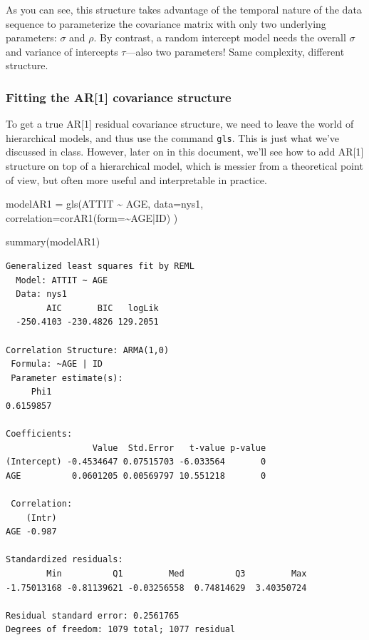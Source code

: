 \documentclass[
  letterpaper,
  DIV=11,
  numbers=noendperiod]{scrreprt}
\newenvironment{Shaded}{\begin{snugshade}}{\end{snugshade}}
\newcommand{\AttributeTok}[1]{\textcolor[rgb]{0.49,0.56,0.16}{#1}}
\newcommand{\FunctionTok}[1]{\textcolor[rgb]{0.02,0.16,0.49}{#1}}
\newcommand{\NormalTok}[1]{\textcolor[rgb]{0.00,0.44,0.13}{#1}}
\newcommand{\OtherTok}[1]{\textcolor[rgb]{0.00,0.44,0.13}{#1}}
\newcommand{\SpecialCharTok}[1]{\textcolor[rgb]{0.25,0.44,0.63}{#1}}
\begin{document}
As you can see, this structure takes advantage of the temporal nature of
the data sequence to parameterize the covariance matrix with only two
underlying parameters: \(\sigma\) and \(\rho\). By contrast, a random
intercept model needs the overall \(\sigma\) and variance of intercepts
\(\tau\)---also two parameters! Same complexity, different structure.

\hypertarget{fitting-the-ar1-covariance-structure}{%
\subsubsection{Fitting the AR{[}1{]} covariance
structure}\label{fitting-the-ar1-covariance-structure}}

To get a true AR{[}1{]} residual covariance structure, we need to leave
the world of hierarchical models, and thus use the command \texttt{gls}.
This is just what we've discussed in class. However, later on in this
document, we'll see how to add AR{[}1{]} structure on top of a
hierarchical model, which is messier from a theoretical point of view,
but often more useful and interpretable in practice.

\begin{Shaded}
\begin{Highlighting}[]
\NormalTok{modelAR1 }\OtherTok{=} \FunctionTok{gls}\NormalTok{(ATTIT }\SpecialCharTok{\textasciitilde{}}\NormalTok{ AGE, }
                    \AttributeTok{data=}\NormalTok{nys1,}
                    \AttributeTok{correlation=}\FunctionTok{corAR1}\NormalTok{(}\AttributeTok{form=}\SpecialCharTok{\textasciitilde{}}\NormalTok{AGE}\SpecialCharTok{|}\NormalTok{ID) )}

\FunctionTok{summary}\NormalTok{(modelAR1)}
\end{Highlighting}
\end{Shaded}

\begin{verbatim}
Generalized least squares fit by REML
  Model: ATTIT ~ AGE 
  Data: nys1 
        AIC       BIC   logLik
  -250.4103 -230.4826 129.2051

Correlation Structure: ARMA(1,0)
 Formula: ~AGE | ID 
 Parameter estimate(s):
     Phi1 
0.6159857 

Coefficients:
                 Value  Std.Error   t-value p-value
(Intercept) -0.4534647 0.07515703 -6.033564       0
AGE          0.0601205 0.00569797 10.551218       0

 Correlation: 
    (Intr)
AGE -0.987

Standardized residuals:
        Min          Q1         Med          Q3         Max 
-1.75013168 -0.81139621 -0.03256558  0.74814629  3.40350724 

Residual standard error: 0.2561765 
Degrees of freedom: 1079 total; 1077 residual
\end{verbatim}
\end{document}
